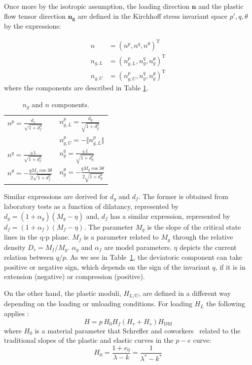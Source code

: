 \documentclass[preprint,12pt,a4paper]{elsarticle}
\begin{document}
Once more by the isotropic assumption, the loading direction $ \boldsymbol{n}$ and the plastic flow tensor direction $ \boldsymbol{n_g}$ are defined in the Kirchhoff stress invariant space $p', q, \theta $ by the expressions:

\begin{eqnarray}
n &=\left(n^{p}, n^{q}, n^{\theta}\right)^{\mathrm{T}} \\ n_{g,L} &=\left(n_{g,L}^{p}, n_{g}^{q}, n_{g}^{\theta}\right)^{\mathrm{T}}
\\ n_{g,U} &=\left(n_{g,U}^{p}, n_{g}^{q}, n_{g}^{\theta}\right)^{\mathrm{T}}
\end{eqnarray}
where the components are described in Table \ref{tab2}.

\begin{table}[H]
\caption{\label{tab2} $n_{g}$ and $n$ components.} 
\centering
	\begin{tabular}{l|l}
        $n^{p} =\frac{d_{f}}{\sqrt{1+d_{f}^{2}}}$ &
        $n_{g,L}^{p} =\frac{d_{g}}{\sqrt{1+d_{g}^{2}}}$
        \\ 
         &
        $n_{g,U}^{p} = -\Vert n_{g,L}^{p} \Vert$ \\
        $n^{q} =\frac{\pm 1}{\sqrt{1+d_{f}^{2}}}$ &
        $n_{g}^{q} = \frac{\pm 1}{\sqrt{1+d_{g}^{2}}}$ \\  
        $n^{\theta} =-\frac{q M_{f} \cos 3 \theta}{2 \sqrt{1+d_{f}^{2}}}$ &
         $n_{g}^{\theta} =-\frac{q M_{g} \cos 3 \theta}{2 \sqrt{1+d_{g}^{2}}}$
	\end{tabular}
\end{table}

Similar expressions are derived for $d_{g}$ and $d_{f}$. The former is obtained from laboratory tests as a function of dilatancy, represented by  $d_{g}=\left(1+\alpha_{g}\right)\left(M_{g}-\eta\right)$ and, $d_{f}$ has a similar expression, represented by   $d_{f}=\left(1+\alpha_{f}\right)\left(M_{f}-\eta\right)$. The parameter $M_{g}$ is the slope of the critical state lines in the q-p plane. $M_{f}$ is a parameter related to $M_{g}$ through the relative density $D_r = M_{f} / M_{g}$. $\alpha_{g}$ and $\alpha_{f}$ are model parameters. $\eta$ depicts the current relation between $q/p$. As we see in Table~\ref{tab2}, the deviatoric component can take positive or negative sign, which depends on the sign of the invariant $q$, if it is in extension (negative) or compression (positive).

 On the other hand, the plastic moduli, $H_{L / U}$, are defined in a different way depending on the loading or unloading conditions. For loading $H_L$ the following applies :
\begin{equation}
H=p\,H_{0}  H_{f}\left(H_{v}+H_{s}\right) H_{\mathrm{DM}}
\end{equation}\label{Eq_H}
where $H_0$ is a material parameter that Schrefler and coworkers~\cite{Santagiuliana2006} related to the traditional slopes of the plastic and elastic curves in the $p-e$ curve:
\begin{equation}
H_{0}=\frac{1+e_{0}}{\lambda-k}=\frac{1}{\lambda^*-k^*}
\end{equation}
\end{document}
